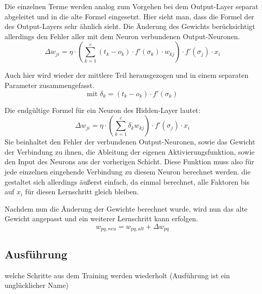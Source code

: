 Die einzelnen Terme werden analog zum Vorgehen bei dem Output-Layer separat abgeleitet und in die alte Formel eingesetzt. Hier sieht man, dass die Formel der des Output-Layers sehr ähnlich sieht. Die Änderung des Gewichts berücksichtigt allerdings den Fehler aller mit dem Neuron verbundenen Output-Neuronen.
\begin{equation}
\Delta w_{ji} = \eta \cdot \left(\sum_{k=1}^{c}(t_k-o_k)\cdot f'(\sigma_k)\cdot w_{kj}\right) \cdot f'(\sigma_j) \cdot x_i
\end{equation}

Auch hier wird wieder der mittlere Teil herausgezogen und in einem separaten Parameter zusammengefasst.
\begin{equation}
\mbox{mit } \delta_k = (t_k-o_k)\cdot f'(\sigma_k)
\end{equation}

Die endgültige Formel für ein Neuron des Hidden-Layer lautet:
\begin{equation}
\Delta w_{ji}=\eta \cdot \left(\sum_{k=1}^{c} \delta_k w_{kj}\right)\cdot f'(\sigma_j)\cdot x_i
\end{equation}
Sie beinhaltet den Fehler der verbundenen Output-Neuronen, sowie das Gewicht der Verbindung zu ihnen, die Ableitung der eigenen Aktivierungsfunktion, sowie den Input des Neurons aus der vorherigen Schicht. Diese Funktion muss also für jede einzelnen eingehende Verbindung zu diesem Neuron berechnet werden. die gestaltet sich allerdings äußerst einfach, da einmal berechnet, alle Faktoren bis auf $x_i$ für diesen Lernschritt gleich bleiben.

Nachdem nun die Änderung der Gewichte berechnet wurde, wird nun das alte Gewicht angepasst und ein weiterer Lernschritt kann erfolgen.
\begin{equation}
w_{pq, neu}=w_{pq, alt}+\Delta w_{pq}
\end{equation}




\subsection{Ausführung}
welche Schritte aus dem Training werden wiederholt
(Ausführung ist ein unglücklicher Name)
